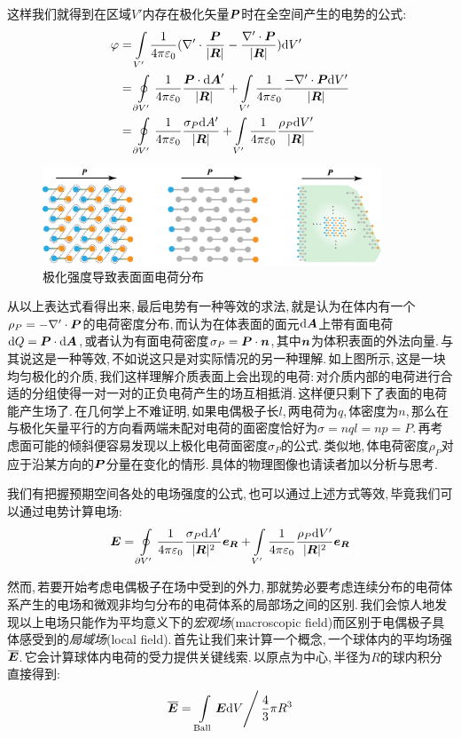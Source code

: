 这样我们就得到在区域$V'$内存在极化矢量$\boldsymbol{P}$时在全空间产生的电势的公式:
\begin{align*}
\varphi 	&=\int\limits_{V'}\frac{1}{4\pi\varepsilon_0} (\nabla'\cdot\frac{\boldsymbol{P}}{|\boldsymbol{R}|}-\frac{\nabla'\cdot \boldsymbol{P}}{|\boldsymbol{R}|})\textrm{d} V'\\
			&=\oint\limits_{\partial V'} \frac{1}{4\pi\varepsilon_0} \frac{\boldsymbol{P}\cdot\textrm{d} \boldsymbol{A}'}{|\boldsymbol{R}|}+\int\limits_{V'}\frac{1}{4\pi\varepsilon_0}\frac{-\nabla'\cdot \boldsymbol{P} \textrm{d} V'}{|\boldsymbol{R}|}\\
			&=\oint\limits_{\partial V'} \frac{1}{4\pi\varepsilon_0} \frac{\sigma_P\textrm{d} A'}{|\boldsymbol{R}|}+\int\limits_{V'}\frac{1}{4\pi\varepsilon_0}\frac{\rho_P \textrm{d} V'}{|\boldsymbol{R}|}
\end{align*}

\begin{figure}[H]
\centering
\includegraphics[width=0.9\textwidth]{image/7-1-16.png}
\caption{极化强度导致表面面电荷分布}
\end{figure}

从以上表达式看得出来,\,最后电势有一种等效的求法,\,就是认为在体内有一个$\rho_P=-\nabla'\cdot\boldsymbol{P}$的电荷密度分布,\,而认为在体表面的面元$\textrm{d} \boldsymbol{A}$上带有面电荷$\textrm{d} Q=\boldsymbol{P}\cdot\textrm{d} \boldsymbol{A}$,\,或者认为有面电荷密度$\sigma_P=\boldsymbol{P}\cdot\boldsymbol{n}$,\,其中$\boldsymbol{n}$为体积表面的外法向量.\,与其说这是一种等效,\,不如说这只是对实际情况的另一种理解.\,如上图所示,\,这是一块均匀极化的介质,\,我们这样理解介质表面上会出现的电荷:\,对介质内部的电荷进行合适的分组使得一对一对的正负电荷产生的场互相抵消.\,这样便只剩下了表面的电荷能产生场了.\,在几何学上不难证明,\,如果电偶极子长$l$,\,两电荷为$q$,\,体密度为$n$,\,那么在与极化矢量平行的方向看两端未配对电荷的面密度恰好为$\sigma=nql=np=P$.\,再考虑面可能的倾斜便容易发现以上极化电荷面密度$\sigma_P$的公式.\,类似地,\,体电荷密度$\rho_P$对应于沿某方向的$\boldsymbol{P}$分量在变化的情形.\,具体的物理图像也请读者加以分析与思考.

我们有把握预期空间各处的电场强度的公式,\,也可以通过上述方式等效,\,毕竟我们可以通过电势计算电场:
\[\boldsymbol{E}=\oint\limits_{\partial V'} \frac{1}{4\pi\varepsilon_0} \frac{\sigma_P\textrm{d} A'}{|\boldsymbol{R}|^2}\boldsymbol{e}_{\boldsymbol{R}}+\int\limits_{V'}\frac{1}{4\pi\varepsilon_0}\frac{\rho_P \textrm{d} V'}{|\boldsymbol{R}|^2}\boldsymbol{e}_{\boldsymbol{R}}\]

然而,\,若要开始考虑电偶极子在场中受到的外力,\,那就势必要考虑连续分布的电荷体系产生的电场和微观非均匀分布的电荷体系的局部场之间的区别.\,我们会惊人地发现以上电场只能作为平均意义下的\emph{宏观场}(macroscopic field)而区别于电偶极子具体感受到的\emph{局域场}(local field).\,首先让我们来计算一个概念,\,一个球体内的平均场强$\overline{\boldsymbol{E}}$.\,它会计算球体内电荷的受力提供关键线索.\,以原点为中心,\,半径为$R$的球内积分直接得到:
\[\overline{\boldsymbol{E}}=\left.\int\limits_{\rm Ball}\boldsymbol{E} \textrm{d} V\right/ \frac{4}{3}\pi R^3\]

